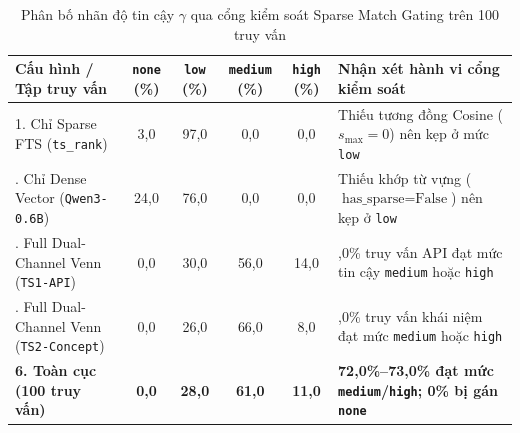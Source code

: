 \begin{table}[H]
\centering
\caption{Phân bố nhãn độ tin cậy $\gamma$ qua cổng kiểm soát Sparse Match Gating trên 100 truy vấn}
\label{tab:confidence_eval}
\footnotesize\setlength{\tabcolsep}{4pt}\begin{tabularx}{\textwidth}{lcccc>{\raggedright\arraybackslash}X}
\toprule
\textbf{Cấu hình / Tập truy vấn} & \textbf{\texttt{none} (\%)} & \textbf{\texttt{low} (\%)} & \textbf{\texttt{medium} (\%)} & \textbf{\texttt{high} (\%)} & \textbf{Nhận xét hành vi cổng kiểm soát} \\
\midrule
1. Chỉ Sparse FTS (\texttt{ts\_rank}) & 3,0 & 97,0 & 0,0 & 0,0 & Thiếu tương đồng Cosine ($s_{\max}=0$) nên kẹp ở mức \texttt{low} \\
\addlinespace[2pt]
2. Chỉ Dense Vector (\texttt{Qwen3-0.6B}) & 24,0 & 76,0 & 0,0 & 0,0 & Thiếu khớp từ vựng ($\text{has\_sparse}=\text{False}$) nên kẹp ở \texttt{low} \\
\addlinespace[2pt]
6. Full Dual-Channel Venn (\texttt{TS1-API}) & 0,0 & 30,0 & 56,0 & 14,0 & 70,0\% truy vấn API đạt mức tin cậy \texttt{medium} hoặc \texttt{high} \\
\addlinespace[2pt]
6. Full Dual-Channel Venn (\texttt{TS2-Concept}) & 0,0 & 26,0 & 66,0 & 8,0 & 74,0\% truy vấn khái niệm đạt mức \texttt{medium} hoặc \texttt{high} \\
\midrule
\textbf{6. Toàn cục (100 truy vấn)} & \textbf{0,0} & \textbf{28,0} & \textbf{61,0} & \textbf{11,0} & \textbf{72,0\%--73,0\% đạt mức \texttt{medium}/\texttt{high}; 0\% bị gán \texttt{none}} \\
\bottomrule
\end{tabularx}
\end{table}

